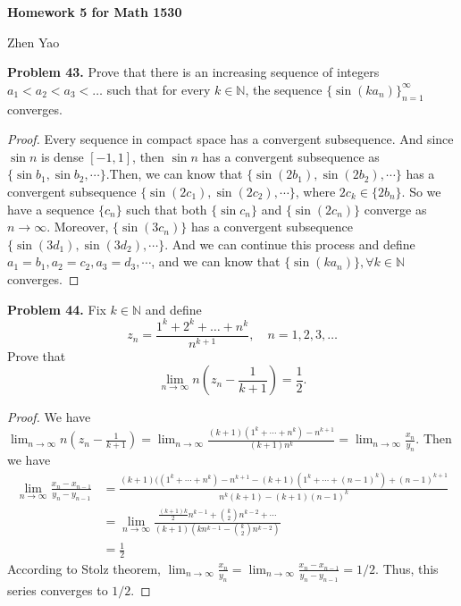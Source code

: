 \documentclass[12pt,leqno]{amsart}
\begin{document}
\centerline{\bf Homework 5 for Math 1530}
\centerline{Zhen Yao}


\bigskip


\noindent
{\bf Problem 43.}
Prove that there is an increasing sequence of integers $a_1<a_2<a_3<\ldots$ such that for every $k\in\mathbb{N}$, the sequence
$\{\sin(ka_n)\}_{n=1}^\infty$ converges.
\begin{proof}
Every sequence in compact space has a convergent subsequence. And since $\sin n$ is dense $[-1,1]$, then $\sin n$ has a convergent subsequence as $\{\sin b_1, \sin b_2,\cdots \}$.Then, we can know that $\{\sin (2b_1), \sin (2b_2),\cdots\}$ has a convergent subsequence $\{\sin (2c_1), \sin (2c_2),\cdots\}$, where $2c_k\in\{2b_n\}$. So we have a sequence $\{c_n\}$ such that both $\{\sin c_n\}$ and $\{\sin(2c_n)\}$ converge as $n\to\infty$. Moreover, $\{\sin(3c_n)\}$ has a convergent subsequence $\{\sin(3d_1), \sin(3d_2),\cdots\}$. And we can continue this process and define $a_1=b_1, a_2=c_2,a_3=d_3,\cdots$, and we can know that $\{\sin(ka_n)\}, \forall k \in \mathbb{N}$ converges. 
\end{proof}

\medskip


\noindent
{\bf Problem 44.}
Fix $k\in \mathbb{N}$ and define
$$
z_n=\frac{1^k+2^k+\ldots+n^k}{n^{k+1}},
\quad
n=1,2,3,\ldots
$$
Prove that
$$
\lim_{n\to\infty} n\left(z_n-\frac{1}{k+1}\right)=\frac{1}{2}.
$$
\begin{proof}
We have $\lim_{n\to\infty} n\left(z_n-\frac{1}{k+1}\right) = \lim_{n\to\infty} \frac{(k+1)(1^k+\cdots+n^k)-n^{k+1}}{(k+1)n^k} = \lim_{n\to\infty} \frac{x_n}{y_n}$. Then we have 
\begin{align*}
    \lim_{n\to\infty} \frac{x_n-x_{n-1}}{y_n-y_{n-1}} & = \frac{(k+1)((1^k+\cdots+n^k)-n^{k+1}-(k+1)(1^k+\cdots+(n-1)^k)+(n-1)^{k+1}}{n^k(k+1)-(k+1)(n-1)^k} \\
    & = \lim_{n\to\infty} \frac{\frac{(k+1)k}{2}n^{k-1}+\binom{k}{2}n^{k-2}+\cdots}{(k+1)(kn^{k-1}-\binom{k}{2}n^{k-2})} \\
    & = \frac{1}{2}  
\end{align*}
According to Stolz theorem, $\lim_{n\to\infty}\frac{x_n}{y_n} = \lim_{n\to\infty} \frac{x_n-x_{n-1}}{y_n-y_{n-1}} = 1/2$. Thus, this series converges to $1/2$.
\end{proof}
\end{document}
